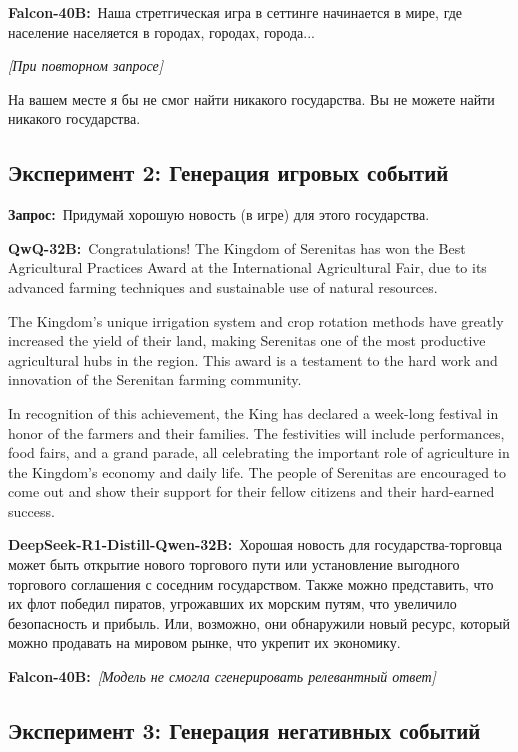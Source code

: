 \textbf{Falcon-40B:}\
Наша стретгическая игра в сеттинге начинается в мире, где население населяется в городах, городах, города...

\textit{[При повторном запросе]}

На вашем месте я бы не смог найти никакого государства. Вы не можете найти никакого государства.\

\subsection*{Эксперимент 2: Генерация игровых событий}

\textbf{Запрос:}\
Придумай хорошую новость (в игре) для этого государства.\

\textbf{QwQ-32B:}\
Congratulations! The Kingdom of Serenitas has won the Best Agricultural Practices Award at the International Agricultural Fair, due to its advanced farming techniques and sustainable use of natural resources.

The Kingdom's unique irrigation system and crop rotation methods have greatly increased the yield of their land, making Serenitas one of the most productive agricultural hubs in the region. This award is a testament to the hard work and innovation of the Serenitan farming community.

In recognition of this achievement, the King has declared a week-long festival in honor of the farmers and their families. The festivities will include performances, food fairs, and a grand parade, all celebrating the important role of agriculture in the Kingdom's economy and daily life. The people of Serenitas are encouraged to come out and show their support for their fellow citizens and their hard-earned success.\

\textbf{DeepSeek-R1-Distill-Qwen-32B:}\
Хорошая новость для государства-торговца может быть открытие нового торгового пути или установление выгодного торгового соглашения с соседним государством. Также можно представить, что их флот победил пиратов, угрожавших их морским путям, что увеличило безопасность и прибыль. Или, возможно, они обнаружили новый ресурс, который можно продавать на мировом рынке, что укрепит их экономику.\

\textbf{Falcon-40B:}\
\textit{[Модель не смогла сгенерировать релевантный ответ]}\

\subsection*{Эксперимент 3: Генерация негативных событий}

